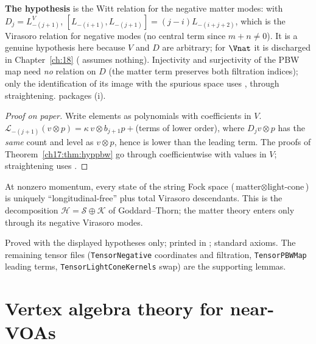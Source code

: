 \begin{dictionary}
\textbf{The hypothesis } is the Witt relation for the negative matter modes: with
$D_j=L^V_{-(j+1)}$, $[L_{-(i+1)},L_{-(j+1)}]=(j-i)L_{-(i+j+2)}$, which is the Virasoro relation for negative modes (no central
term since $m+n\ne0$).  It is a genuine hypothesis here because $V$ and $D$ are arbitrary; for $\Vnat$ it is discharged in
Chapter~\ref{ch:18} ( assumes nothing).  Injectivity and surjectivity of the PBW map need
\emph{no} relation on $D$ (the matter term preserves both filtration indices); only the identification of its image
with the spurious space uses , through straightening.   packages (i).
\end{dictionary}

\begin{proof}[Proof on paper]
Write elements as polynomials with coefficients in $V$.  $\mathcal L_{-(j+1)}(v\otimes p)=\kappa\,v\otimes b_{j+1}p+$(terms of lower
order), where $D_jv\otimes p$ has the \emph{same} count and level as $v\otimes p$, hence is lower than the leading term.  The
proofs of Theorem~\ref{ch17:thm:hyppbw} go through coefficientwise with values in $V$; straightening uses .
\end{proof}

\begin{physics}
At nonzero momentum, every state of the string Fock space ($\text{matter}\otimes\text{light-cone}$) is uniquely
``longitudinal-free'' plus total Virasoro descendants.  This is the decomposition $\mathcal H=\mathcal S\oplus\mathcal K$ of
Goddard--Thorn; the matter theory enters only through its negative Virasoro modes.
\end{physics}

\begin{status}
Proved with the displayed hypotheses only; printed in ; standard axioms.
The remaining tensor files (\texttt{TensorNegative} coordinates and filtration, \texttt{TensorPBWMap} leading terms,
\texttt{TensorLightConeKernels} swap) are the supporting lemmas.
\end{status}

\section{Vertex algebra theory for near-VOAs}\label{ch17:sec:near}

